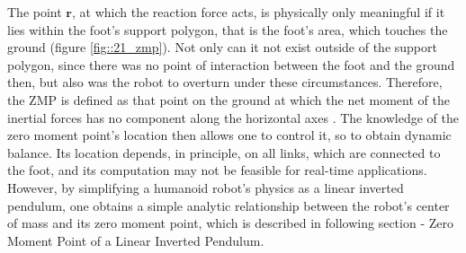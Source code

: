 The point $\bm{r}$, at which the reaction force acts, is physically only meaningful if it lies within the foot's support polygon, that is the foot's area, which touches the ground (figure \ref{fig::21_zmp}). Not only can it not exist outside of the support polygon, since there was no point of interaction between the foot and the ground then, but also was the robot to overturn under these circumstances. Therefore, the ZMP is defined as that point on the ground at which the net moment of the inertial forces has no component along the horizontal axes \cite{hirai1998development}\cite{dasgupta1999making}. The knowledge of the zero moment point's location then allows one to control it, so to obtain dynamic balance. Its location depends, in principle, on all links, which are connected to the foot, and its computation may not be feasible for real-time applications. However, by simplifying a humanoid robot's physics as a linear inverted pendulum, one obtains a simple analytic relationship between the robot's center of mass and its zero moment point, which is described in following section - Zero Moment Point of a Linear Inverted Pendulum.

\FloatBarrier

